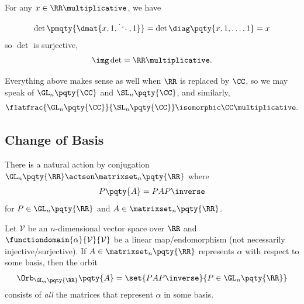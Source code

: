 For any \(x \in \RR\multiplicative\), we have
\[
    \det \pmqty{\dmat{x, 1, \ddots, 1}} = \det\diag\pqty{x, 1, \ldots, 1} = x
\]
so \(\det\) is surjective,
\[
    \img\det = \RR\multiplicative.
\]

Everything above makes sense as well when \(\RR\) is replaced by \(\CC\), so we may speak of \(\GL_n\pqty{\CC}\) and \(\SL_n\pqty{\CC}\), and similarly,
\[
    \flatfrac{\GL_n\pqty{\CC}}{\SL_n\pqty{\CC}} \isomorphic \CC\multiplicative.
\]

\subsection{Change of Basis}
\label{sec:change-of-basis}

There is a natural action by conjugation \(\GL_n\pqty{\RR} \actson \matrixset_n\pqty{\RR}\) where
\[
    P\pqty{A} = P A P\inverse
\]
for \(P \in \GL_n\pqty{\RR}\) and \(A \in \matrixset_n\pqty{\RR}\).

\begin{proposition}
    \label{prop:conjugation-change-of-basis}%
    Let \(\mathcal{V}\) be an \(n\)-dimensional vector space over \(\RR\) and \(\functiondomain{\alpha}{\mathcal{V}}{\mathcal{V}}\) be a linear map/endomorphism (not necessarily injective/surjective). If \(A \in \matrixset_n\pqty{\RR}\) represents \(\alpha\) with respect to some basis, then the orbit
    \[
        \Orb_{\GL_n\pqty{\RR}} \pqty{A} = \set{P A P\inverse}{P \in \GL_n\pqty{\RR}}
    \]
    consists of \emph{all} the matrices that represent \(\alpha\) in some basis.
\end{proposition}

